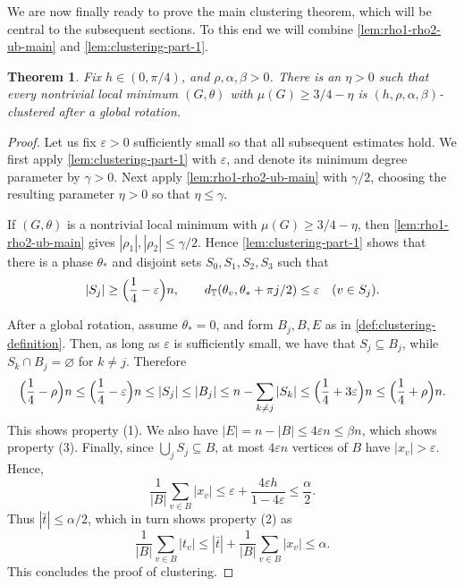 \documentclass[reqno,11pt]{amsart}
\newtheorem{theorem}{Theorem}
\theoremstyle{definition}
\newcommand{\T}{\mathbb{T}}
\newcommand{\abs}[1]{\left\lvert #1\right\rvert}
\newcommand{\distT}{d_{\T}}
\begin{document}
We are now finally ready to prove the main clustering theorem, which will be central to the subsequent sections. To this end we will combine \cref{lem:rho1-rho2-ub-main} and \cref{lem:clustering-part-1}. 

\begin{theorem}\label{thm:clustering-main}
Fix $h\in(0,\pi/4)$, and $\rho, \alpha, \beta > 0$. There is an $\eta>0$ such that every nontrivial
local minimum $(G,\theta)$ with
$\mu(G)\ge3/4-\eta$ is $(h,\rho,\alpha,\beta)$-clustered after a global rotation.
\end{theorem}

\begin{proof}
Let us fix $\varepsilon>0$ sufficiently small so that all subsequent estimates hold. We first apply \cref{lem:clustering-part-1} with $\varepsilon$, and denote
its minimum degree parameter by $\gamma>0$.  Next apply
\cref{lem:rho1-rho2-ub-main} with $\gamma/2$, choosing the
resulting parameter $\eta>0$ so that $\eta\le\gamma$.

If $(G,\theta)$ is a nontrivial local minimum with
$\mu(G)\ge3/4-\eta$, then \cref{lem:rho1-rho2-ub-main} gives
$|{\rho_1}|,|{\rho_2}|\le\gamma/2$.  Hence
\cref{lem:clustering-part-1} shows that there is a phase $\theta_*$ and disjoint
sets $S_0,S_1,S_2,S_3$ such that
\[
    \abs{S_j}\ge\Bigl({\frac14-\varepsilon}\Bigr)n,
    \qquad
    \distT(\theta_v,\theta_*+\pi j/2)\le\varepsilon
    \quad(v\in S_j).
\]

After a global rotation, assume $\theta_*=0$, and form $B_j,B,E$ as in
\cref{def:clustering-definition}.  Then, as long as $\varepsilon$ is sufficiently small, we have that $S_j\subseteq B_j$, while
$S_k\cap B_j=\varnothing$ for $k\ne j$.  Therefore
\[
    \Bigl({\frac14-\rho}\Bigr)n
    \le\Bigl({\frac14-\varepsilon}\Bigr)n
    \le\abs{S_j}
    \le\abs{B_j} \le n-\sum_{k\ne j}\abs{S_k}
    \le\Bigl({\frac14+3\varepsilon}\Bigr)n
    \le\Bigl({\frac14+\rho}\Bigr)n.
\]
This shows property (1). We also have $|E| = n - |B| \leq 4\varepsilon n \leq \beta n$, which shows property (3). Finally, since $\bigcup_jS_j\subseteq B$, at most $4\varepsilon n$ vertices of $B$ have $\abs{x_v}>\varepsilon$. Hence,
\begin{equation*}
    \frac{1}{|B|}\sum_{v \in B}|x_v| \leq \varepsilon + \frac{4\varepsilon h}{1-4\varepsilon} \leq \frac{\alpha}{2}.
\end{equation*}
Thus $\abs{\bar t}\le \alpha/2$, which in turn shows property (2) as 
\[
    \frac{1}{|B|}\sum_{v\in B}\abs{t_v}
    \le \abs{\bar t} +  \frac{1}{|B|}\sum_{v \in B}|x_v|  \leq \alpha.
\]
This concludes the proof of clustering.
\end{proof}
\end{document}
